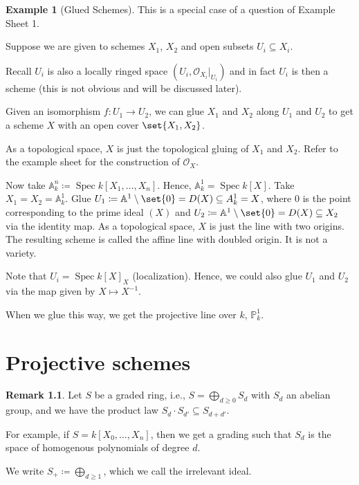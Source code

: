 \documentclass[a4paper]{amsbook}
\theoremstyle{definition}
\newtheorem*{remark*}{Remark}
\newtheorem*{example*}{Example}
\DeclareMathOperator\Spec{Spec}
\begin{document}
\begin{example*}[Glued Schemes]
\label{GluedSchemes}
This is a special case of a question of Example Sheet 1.

Suppose we are given to schemes $X_1$, $X_2$ and open subsets $U_i \subseteq X_i$.

Recall $U_i$ is also a locally ringed space $(U_i, \mathcal{O}_{X_i}|_{U_i})$ and
in fact $U_i$ is then a scheme (this is not obvious and will be discussed later).

Given an isomorphism $f\colon U_1\to U_2$, we can glue $X_1$ and $X_2$ along
$U_1$ and $U_2$ to get a scheme $X$ with an open cover $\set{X_1, X_2}$.

As a topological space, $X$ is just the topological gluing of $X_1$ and $X_2$.
Refer to the example sheet for the construction of $\mathcal{O}_X$.

Now take $\mathbb{A}^n_k \coloneqq \Spec k[X_1, \ldots, X_n]$. Hence,
$\mathbb{A}^1_k = \Spec k[X]$. Take $X_1 = X_2 = \mathbb{A}^1_k$. Glue
$U_1 \coloneqq \mathbb{A}^1\setminus\set{0} = D(X) \subseteq A_k^1 = X$, where $0$ is the point
corresponding to the prime ideal $(X)$ and
$U_2\coloneqq \mathbb{A}^1\setminus\set{0} = D(X) \subseteq X_2$ via the
identity map. As a topological space, $X$ is just the line with two origins.
The resulting scheme is called the affine line with doubled origin. It is not
a variety.

Note that $U_i = \Spec k[X]_X$ (localization). Hence, we could also glue
$U_1$ and $U_2$ via the map given by $X\mapsto X^{-1}$.

When we glue this way, we get the projective line over $k$, $\mathbb{P}^1_k$.
\end{example*}


\chapter{Projective schemes}
\label{ProjectiveSchemes}
\begin{remark*}
\label{Conventions}
Let $S$ be a graded ring, i.e., $S = \bigoplus_{d\geq 0} S_d$ with $S_d$ an abelian
group, and we have the product law $S_d\cdot S_{d'} \subseteq S_{d+d'}$.

For example, if $S = k[X_0, \ldots, X_n]$, then we get a grading such that $S_d$
is the space of homogenous polynomials of degree $d$.

We write $S_+ \coloneqq \bigoplus_{d\geq 1}$, which we call the irrelevant ideal.
\end{remark*}
\end{document}
